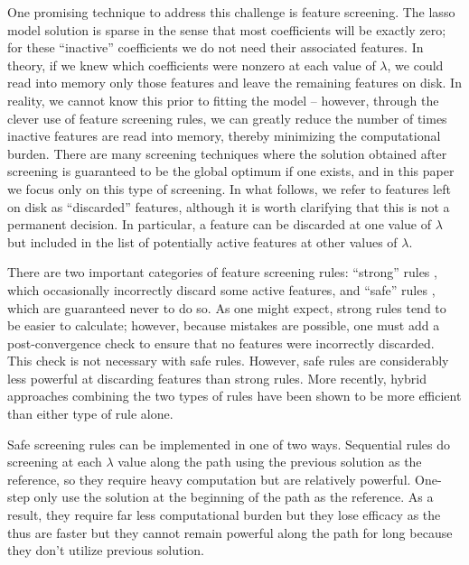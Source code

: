 One promising technique to address this challenge is feature screening. The lasso model solution is sparse in the sense that most coefficients will be exactly zero; for these ``inactive'' coefficients we do not need their associated features.  In theory, if we knew which coefficients were nonzero at each value of $\lambda$, we could read into memory only those features and leave the remaining features on disk. In reality, we cannot know this prior to fitting the model -- however, through the clever use of feature screening rules, we can greatly reduce the number of times inactive features are read into memory, thereby minimizing the computational burden. There are many screening techniques where the solution obtained after screening is guaranteed to be the global optimum if one exists, and in this paper we focus only on this type of screening. In what follows, we refer to features left on disk as ``discarded'' features, although it is worth clarifying that this is not a permanent decision.  In particular, a feature can be discarded at one value of $\lambda$ but included in the list of potentially active features at other values of $\lambda$.

There are two important categories of feature screening rules: ``strong'' rules \citep{tibshirani2011regression, qian2019fast}, which occasionally incorrectly discard some active features, and ``safe'' rules \citep{ghaoui2010safe,wang2013lasso,xiang2012fast, xiang2011learning}, which are guaranteed never to do so.  As one might expect, strong rules tend to be easier to calculate; however, because mistakes are possible, one must add a post-convergence check to ensure that no features were incorrectly discarded. This check is not necessary with safe rules. However, safe rules are considerably less powerful at discarding features than strong rules. More recently, hybrid approaches \citep{Zeng2021} combining the two types of rules have been shown to be more efficient than either type of rule alone.

Safe screening rules can be implemented in one of two ways. Sequential rules do screening at each $\lambda$ value along the path using the previous solution as the reference, so they require heavy computation but are relatively powerful. One-step only use the solution at the beginning of the path as the reference. As a result, they require far less computational burden but they lose efficacy as the thus are faster but they cannot remain powerful along the path for long because they don't utilize previous solution.

